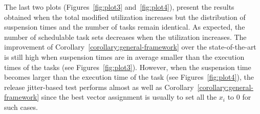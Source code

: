 The last two plots (Figures~\ref{fig:plot3} and~\ref{fig:plot4}), present the results obtained when the total modified utilization increases but the distribution of suspension times and the number of tasks remain identical. As expected, the number of schedulable task sets decreases when the utilization increases.
The improvement of Corollary~\ref{corollary:general-framework} over the state-of-the-art is still high when suspension times are in average smaller than the execution times of the tasks (see Figures~\ref{fig:plot3}). However, when the suspension time becomes larger than the execution time of the task (see Figures~\ref{fig:plot4}), the release jitter-based test performs almost as well as Corollary~\ref{corollary:general-framework} since the best vector assignment is usually to set all the $x_i$ to $0$ for such cases.


